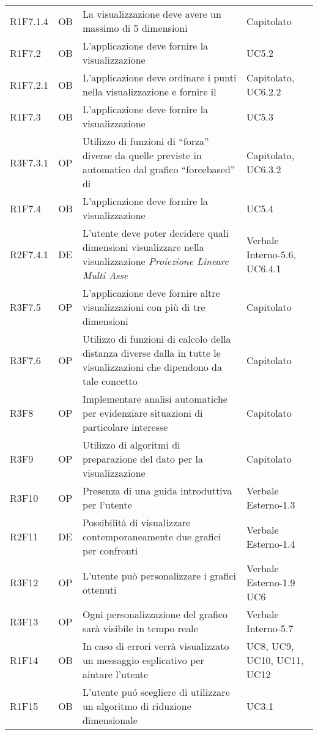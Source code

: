 {\begin{longtable}{C{2cm} | C{1.5cm} | C{9cm} | C{3.3cm}}
R1F7.1.4 & OB & La visualizzazione  deve avere un massimo di 5 dimensioni & Capitolato\\

R1F7.2 & OB & L'applicazione deve fornire la visualizzazione  & UC5.2\\
R1F7.2.1 & OB & L'applicazione deve ordinare i punti nella visualizzazione  e fornire il  & Capitolato, UC6.2.2 \\
R1F7.3 & OB & L'applicazione deve fornire la visualizzazione  & UC5.3\\
R3F7.3.1 & OP & Utilizzo di funzioni di “forza” diverse da quelle previste in automatico dal grafico “forcebased” di  & Capitolato, UC6.3.2\\
R1F7.4 & OB & L'applicazione deve fornire la visualizzazione  & UC5.4 \\
R2F7.4.1 & DE & L'utente deve poter decidere quali dimensioni visualizzare nella visualizzazione \textit{Proiezione Lineare Multi Asse} & Verbale Interno-5.6, UC6.4.1\\
R3F7.5 & OP & L'applicazione deve fornire altre visualizzazioni con più di tre dimensioni & Capitolato\\
R3F7.6 & OP & Utilizzo di funzioni di calcolo della distanza diverse dalla  in tutte le visualizzazioni che dipendono da tale concetto & Capitolato \\
R3F8 & OP & Implementare analisi automatiche per evidenziare situazioni di particolare interesse & Capitolato\\
R3F9 & OP & Utilizzo di algoritmi di preparazione del dato per la visualizzazione & Capitolato\\
R3F10 & OP & Presenza di una guida introduttiva per l'utente & Verbale Esterno-1.3\\
R2F11 & DE & Possibilità di visualizzare contemporaneamente due grafici per confronti & Verbale Esterno-1.4\\
R3F12 & OP & L'utente può personalizzare i grafici ottenuti & Verbale Esterno-1.9 \newline UC6 \\
R3F13 & OP & Ogni personalizzazione del grafico sarà visibile in tempo reale & Verbale Interno-5.7 \\
R1F14 & OB & In caso di errori verrà visualizzato un messaggio esplicativo per aiutare l'utente & UC8, UC9, UC10, UC11, UC12\\
R1F15 & OB & L'utente puó scegliere di utilizzare un algoritmo di riduzione dimensionale & UC3.1 \\

\end{longtable}}
